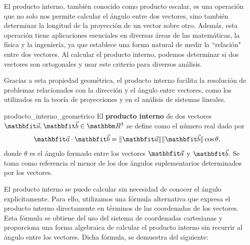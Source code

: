 El producto interno, también conocido como producto escalar, es una operación que no solo nos permite calcular el ángulo entre dos vectores, sino también determinar la longitud de la proyección de un vector sobre otro. Además, esta operación tiene aplicaciones esenciales en diversas áreas de las matemáticas, la física y la ingeniería, ya que establece una forma natural de medir la ``relación" entre dos vectores. Al calcular el producto interno, podemos determinar si dos vectores son ortogonales y usar este criterio para diversos análisis.

Gracias a esta propiedad geométrica, el producto interno facilita la resolución de problemas relacionados con la dirección y el ángulo entre vectores, como los utilizados en la teoría de proyecciones y en el análisis de sistemas lineales.

\begin{definition}{}{producto_interno_geometrico}
    El \textbf{producto interno} de dos vectores $\veca, \vecb \in \RR[3]$ se define como el número real dado por
    $$\veca \cdot \vecb = \|\veca\| \|\vecb\| \cos\theta,$$
    donde $\theta$ es el ángulo formado entre los vectores $\veca$ y $\vecb$. Se toma como referencia el menor de los dos ángulos suplementarios determinados por los vectores.
\end{definition}

El producto interno se puede calcular sin necesidad de conocer el ángulo explícitamente. Para ello, utilizamos una fórmula alternativa que expresa el producto interno directamente en términos de las coordenadas de los vectores. Esta fórmula se obtiene del uso del sistema de coordenadas cartesianas y proporciona una forma algebraica de calcular el producto interno sin recurrir al ángulo entre los vectores. Dicha fórmula, se demuestra del siguiente:

